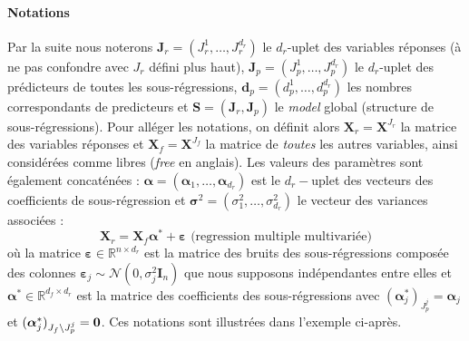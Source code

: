 \documentclass[12pt,a4paper]{report}
\begin{document}
\paragraph{Notations} Par la suite nous noterons $\boldsymbol{J}_r=(J_{r}^1,\ldots,J_r^{d_r})$ le $d_r$-uplet des variables réponses (à ne pas confondre avec $J_r$ défini plus haut), $\boldsymbol{J}_p=(J_{p}^1,\ldots,J_p^{d_r})$ le $d_r$-uplet des prédicteurs de toutes les sous-régressions, $\boldsymbol{d}_p=(d_p^1,\ldots,d_p^{d_{r}})$ les nombres correspondants de predicteurs et $\boldsymbol{S}=(\boldsymbol{J}_r,\boldsymbol{J}_p)$ le {\it model} global (structure de sous-régressions). Pour alléger les notations, on définit alors $\boldsymbol{X}_r=\boldsymbol{X}^{J_{r}}$ la matrice des variables réponses et $\boldsymbol{X}_f=\boldsymbol{X}^{J_{f}}$ la matrice de {\it toutes} les autres variables, ainsi considérées comme libres ({\it free} en anglais). Les valeurs des paramètres sont également concaténées : $\boldsymbol{\alpha}=(\boldsymbol{\alpha}_1,\ldots,\boldsymbol{\alpha}_{d_r})$ est le $d_r-$uplet des vecteurs des coefficients de sous-régression et $\boldsymbol{\sigma}^2=(\sigma^2_1,\ldots,\sigma^2_{d_r})$ le vecteur des variances associées :
	\begin{equation}
		\boldsymbol{X}_{r}%
		=\boldsymbol{X}_{f}\boldsymbol{\alpha}^*+\boldsymbol{\varepsilon} \textrm{ \ \ \ (regression multiple multivariée)}  \nonumber 
	\end{equation}
	où la matrice $\boldsymbol{\varepsilon}\in \mathbb{R}^{n\times d_r}$ est la matrice des bruits des sous-régressions composée des colonnes \mbox{$\boldsymbol{\varepsilon}_j\sim \mathcal{N}(0,\sigma^2_j\boldsymbol{I}_n)$} que nous supposons indépendantes entre elles et $\boldsymbol{\alpha}^* \in \mathbb{R}^{d_f\times d_r}$ est la matrice des coefficients des sous-régressions avec $(\boldsymbol{\alpha}_j^*)_{J_p^j}=\boldsymbol{\alpha}_j $ et $(\boldsymbol{\alpha}_j^*)_{J_f\setminus J_p^j}=\bf 0$. Ces notations sont illustrées dans l'exemple ci-après. \\
	\\
\end{document}
